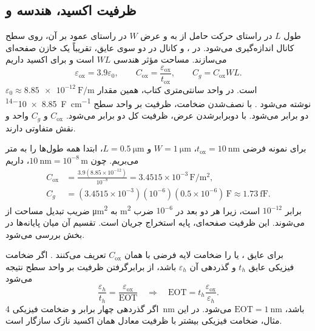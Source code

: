 \subsection{ظرفیت اکسید، هندسه و }
طول \(L\) در راستای حرکت حامل از  به  و عرض \(W\)
در راستای عمود بر آن، روی سطح کانال اندازه‌گیری می‌شود.
در ،  و کانال در دو سوی عایق، تقریباً یک خازن
صفحه‌ای می‌سازند. مساحت مؤثر هندسی \(WL\) است و برای اکسید  داریم
\begin{equation}
 \varepsilon_{\mathrm{ox}}=3.9\varepsilon_0,\qquad
 C_{\mathrm{ox}}=\frac{\varepsilon_{\mathrm{ox}}}{t_{\mathrm{ox}}},\qquad
 C_g=C_{\mathrm{ox}}WL.
 \label{eq:mos-oxide-cap}
\end{equation}
\(\varepsilon_0\approx\qty{8.85e-12}{\farad\per\metre}\) است.
در واحد سانتی‌متری کتاب، همین مقدار
\qty{8.85e-14}{\farad\per\centi\metre} نوشته می‌شود
\cite[رابطه ، شکل ]{weste}.
با نصف‌شدن ضخامت، ظرفیت بر واحد سطح دو برابر می‌شود. با دوبرابرشدن عرض، ظرفیت
کل دو برابر می‌شود. \(C_{\mathrm{ox}}\) و \(C_g\) واحد و نقش متفاوتی دارند.

برای نمونه فرضی \(t_{\mathrm{ox}}=\qty{10}{\nano\metre}\)،
\(W=\qty{1}{\micro\metre}\) و \(L=\qty{0.5}{\micro\metre}\)، ابتدا همه طول‌ها
را به متر می‌بریم. چون \(\qty{10}{\nano\metre}=10^{-8}\,\unit{\metre}\)، داریم
\begin{align*}
 C_{\mathrm{ox}}&=\frac{3.9(8.85\times10^{-12})}{10^{-8}}
 =3.4515\times10^{-3}\,\unit{\farad\per\metre\squared},\\
 C_g&=(3.4515\times10^{-3})(10^{-6})(0.5\times10^{-6})\,\unit{\farad}
 \approx\qty{1.73}{\femto\farad}.
\end{align*}
ضریب تبدیل مساحت از \unit{\micro\metre\squared} به \unit{\metre\squared}
برابر \(10^{-12}\) است، زیرا هر دو بعد در \(10^{-6}\) ضرب می‌شوند.
این ظرفیت صفحه‌ای، پایه استخراج جریان است. تقسیم آن میان پایانه‌ها در بخش
 بررسی می‌شود.

برای عایق ،  یا  را ضخامت
لایه فرضی  با همان \(C_{\mathrm{ox}}\) تعریف می‌کنند
\cite[صفحه ۶۶]{weste}. اگر ضخامت فیزیکی عایق \(t_h\) و گذردهی آن
\(\varepsilon_h\) باشد، از برابرگرفتن ظرفیت بر واحد سطح نتیجه می‌شود
\begin{equation}
 \frac{\varepsilon_h}{t_h}=\frac{\varepsilon_{\mathrm{ox}}}{\mathrm{EOT}}
 \quad\Longrightarrow\quad
 \mathrm{EOT}=t_h\frac{\varepsilon_{\mathrm{ox}}}{\varepsilon_h}.
 \label{eq:mos-eot}
\end{equation}
اگر گذردهی چهار برابر و ضخامت فیزیکی \qty{4}{\nano\metre} باشد،
\(\mathrm{EOT}=\qty{1}{\nano\metre}\) می‌شود. در این مثال، ضخامت فیزیکی بیشتر
با ظرفیت معادل همان اکسید نازک سازگار است.

